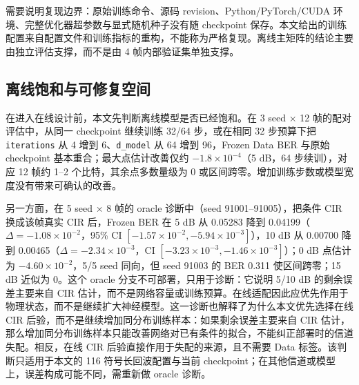 需要说明复现边界：原始训练命令、源码 revision、Python/PyTorch/CUDA 环境、完整优化器超参数与显式随机种子没有随 checkpoint 保存。本文给出的训练配置来自配置文件和训练指标的重构，不能称为严格复现。离线主矩阵的结论主要由独立评估支撑，而不是由 4 帧内部验证集单独支撑。

\subsection{离线饱和与可修复空间}

在进入在线设计前，本文先判断离线模型是否已经饱和。在 3 seed × 12 帧的配对评估中，从同一 checkpoint 继续训练 32/64 步，或在相同 32 步预算下把 \texttt{iterations} 从 4 增到 6、\texttt{d\_model} 从 64 增到 96，Frozen Data BER 与原始 checkpoint 基本重合；最大点估计改善仅约 $-1.8\times10^{-4}$（5 dB，64 步续训），对应 12 帧约 1–2 个比特，其余点多数量级为 0 或区间跨零。增加训练步数或模型宽度没有带来可确认的改善。

另一方面，在 5 seed × 8 帧的 oracle 诊断中（seed 91001–91005），把条件 CIR 换成该帧真实 CIR 后，Frozen BER 在 5 dB 从 0.05283 降到 0.04199（$\Delta=-1.08\times10^{-2}$，95\% CI $[-1.57\times10^{-2},-5.94\times10^{-3}]$），10 dB 从 0.00700 降到 0.00465（$\Delta=-2.34\times10^{-3}$，CI $[-3.23\times10^{-3},-1.46\times10^{-3}]$）；0 dB 点估计为 $-4.60\times10^{-2}$，5/5 seed 同向，但 seed 91003 的 BER 0.311 使区间跨零；15 dB 近似为 0。这个 oracle 分支不可部署，只用于诊断：它说明 5/10 dB 的剩余误差主要来自 CIR 估计，而不是网络容量或训练预算。在线适配因此应优先作用于物理状态，而不是继续扩大神经模型。这一诊断也解释了为什么本文优先选择在线 CIR 后验，而不是继续增加同分布训练样本：如果剩余误差主要来自 CIR 估计，那么增加同分布训练样本只能改善网络对已有条件的拟合，不能纠正部署时的信道失配。相反，在线 CIR 后验直接作用于失配的来源，且不需要 Data 标签。该判断只适用于本文的 116 符号长回波配置与当前 checkpoint；在其他信道或模型上，误差构成可能不同，需重新做 oracle 诊断。
